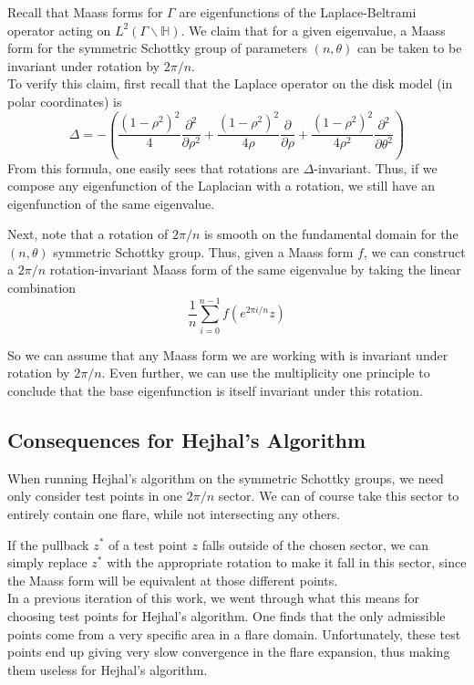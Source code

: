 \documentclass[]{article}
\begin{document}
Recall that Maass forms for $\Gamma$ are eigenfunctions of the Laplace-Beltrami operator acting on $L^2(\Gamma\backslash\mathbb{H})$.
We claim that for a given eigenvalue, a Maass form for the symmetric Schottky group of parameters $(n, \theta)$ can be taken to be invariant under rotation by $2\pi/n$.
\\

To verify this claim, first recall that the Laplace operator on the disk model (in polar coordinates) is
$$
\Delta = -\left(\frac{(1 - \rho^2)^2}{4}\frac{\partial^2}{\partial\rho^2} +
\frac{(1 - \rho^2)^2}{4\rho}\frac{\partial}{\partial\rho} +
\frac{(1 - \rho^2)^2}{4\rho^2}\frac{\partial^2}{\partial\theta^2}\right)
$$
From this formula, one easily sees that rotations are $\Delta$-invariant.
Thus, if we compose any eigenfunction of the Laplacian with a rotation, we still have an eigenfunction of the same eigenvalue.

Next, note that a rotation of $2\pi/n$ is smooth on the fundamental domain for the $(n, \theta)$ symmetric Schottky group.
Thus, given a Maass form $f$, we can construct a $2\pi/n$ rotation-invariant Maass form of the same eigenvalue by taking the linear combination
$$
\frac{1}{n}\sum_{i = 0}^{n - 1}f\left(e^{2\pi i/n} z\right)
$$

So we can assume that any Maass form we are working with is invariant under rotation by $2\pi/n$.
Even further, we can use the multiplicity one principle to conclude that the base eigenfunction is itself invariant under this rotation.

\subsection*{Consequences for Hejhal's Algorithm}

When running Hejhal's algorithm on the symmetric Schottky groups, we need only consider test points in one $2\pi/n$ sector.
We can of course take this sector to entirely contain one flare, while not intersecting any others.

If the pullback $z^*$ of a test point $z$ falls outside of the chosen sector, we can simply replace $z^*$ with the appropriate rotation to make it fall in this sector, since the Maass form will be equivalent at those different points.
\\

In a previous iteration of this work, we went through what this means for choosing test points for Hejhal's algorithm.
One finds that the only admissible points come from a very specific area in a flare domain.
Unfortunately, these test points end up giving very slow convergence in the flare expansion, thus making them useless for Hejhal's algorithm.
\end{document}
